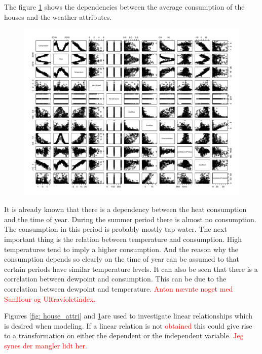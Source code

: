\noindent The figure \ref{fig: weather_cons} shows the dependencies between the average consumption of the houses and the weather attributes.
\begin{figure}
    \centering
    \includegraphics[width=.8\textwidth]{../../../figures/weather_cons.pdf}
    \caption{}
    \label{fig: weather_cons}
\end{figure}

\noindent It is already known that there is a dependency between the heat consumption and the time of year. During the summer period there
is almost no consumption. The consumption in this period is probably mostly tap water. The next important thing is the relation between temperature and consumption. High temperatures tend to imply a higher consumption. And the reason why the consumption depends so clearly on the time of year can be assumed to that certain periods have similar temperature levels. It can also be seen that there is a correlation between dewpoint and consumption. This can be due to the correlation between dewpoint and temperature. \textcolor{red}{Anton nævnte noget med SunHour og Ultravioletindex.}

Figures \ref{fig: house_attri} and \ref{fig: weather_cons}are used to investigate linear relationships which is desired when modeling. If a linear relation is not \textcolor{red}{obtained} this could give rise to a transformation on either the dependent or the independent variable. \textcolor{red}{Jeg synes der mangler lidt her.}

